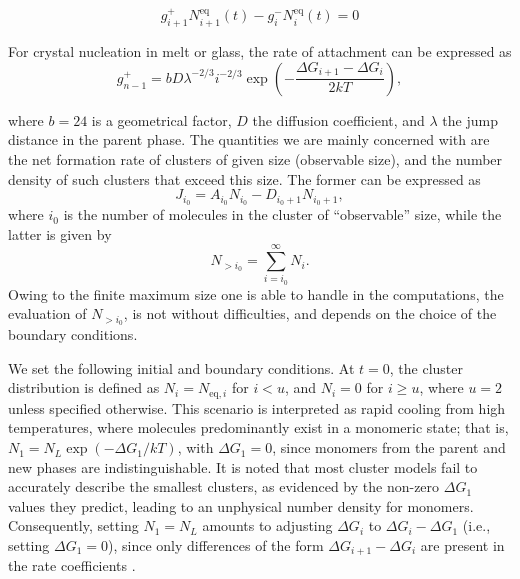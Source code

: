 \begin{equation}
g^+_{i+1} N^{\text{eq}}_{i+1}(t) - g^-_i N^{\text{eq}}_i(t) = 0
\label{eq:current_equilibrium}
\end{equation}

For crystal nucleation in melt or glass, the rate of attachment can be expressed as
\begin{equation}
g^+_{n-1} = bD \lambda^{-2/3} i^{-2/3} \exp\left(-\frac{\Delta G_{i+1} - \Delta G_i}{2kT}\right),
\label{eq:attachment_rate}
\end{equation}

where \( b = 24 \) is a geometrical factor, \( D \) the diffusion coefficient, and \( \lambda \) the jump distance in the parent phase.
The quantities we are mainly concerned with are the net formation rate of clusters of given size (observable size), and the number density 
of such clusters that exceed this size. The former can be expressed as
\begin{equation}
J_{i_0} = A_{i_0} N_{i_0} - D_{i_0 + 1} N_{i_0 + 1},
\end{equation}
where \( i_0 \) is the number of molecules in the cluster of ``observable'' size, while the latter is given by
\begin{equation}
N_{> i_0} = \sum_{i=i_0}^{\infty} N_i.
\end{equation}
Owing to the finite maximum size one is able to handle in the computations, the evaluation of \( N_{> i_0} \), is not without difficulties, 
and depends on the choice of the boundary conditions.

We set the following initial and boundary conditions. At \( t = 0 \), the cluster distribution is defined 
as \( N_i = N_{\text{eq}, i} \) for \( i < u \), and \( N_i = 0 \) for \( i \geq u \), where \( u = 2 \) unless 
specified otherwise. This scenario is interpreted as rapid cooling from high temperatures, where molecules predominantly 
exist in a monomeric state; that is, \( N_1 = N_L \exp(-\Delta G_1 / kT) \), with \( \Delta G_1 = 0 \), since monomers from the parent 
and new phases are indistinguishable. It is noted that most cluster models fail to accurately describe the smallest clusters, 
as evidenced by the non-zero \( \Delta G_1 \) values they predict, leading to an unphysical number density for monomers. Consequently, 
setting \( N_1 = N_L \) amounts to adjusting \( \Delta G_i \) to \( \Delta G_i - \Delta G_1 \) (i.e., setting \( \Delta G_1 = 0 \)), since only differences 
of the form \( \Delta G_{i+1} - \Delta G_i \) are present in the rate coefficients \cite{Laszlo4}.

